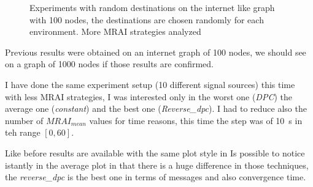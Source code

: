 \documentclass[10pt,conference,letterpaper]{IEEEtran}
\newcommand{\figvspace}{-1.5em}
\begin{document}
\begin{figure}[tb]
	\caption{Experiments with random destinations on the internet like graph with
		\num{100} nodes, the destinations are chosen randomly for each environment.
		More \ac{MRAI} strategies analyzed}
	\label{fig:different_destinations-100}
	\vspace{\figvspace}
\end{figure}

Previous results were obtained on an internet graph of \num{100} nodes, we should
see on a graph of \num{1000} nodes if those results are confirmed.

I have done the same experiment setup (\num{10} different signal sources) this
time with less \ac{MRAI} strategies, I was interested only in the worst one (\textit{DPC})
the average one (\textit{constant}) and the best one (\textit{Reverse\_dpc}).
I had to reduce also the number of $MRAI_{mean}$ values for time reasons, this time
the step was of \SI{10}{\second} in teh range $[0, 60]$.

Like before results are available with the same plot style in 
Is possible to notice istantly in the average plot in 
that there is a huge difference in those techniques, the \textit{reverse\_dpc} is
the best one in terms of messages and also convergence time.
\end{document}
